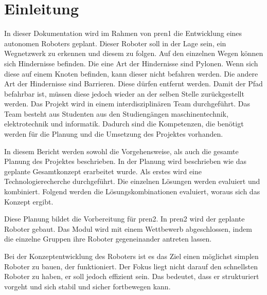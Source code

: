 \section{Einleitung}

In dieser Dokumentation wird im Rahmen von \acrfull{pren1} die Entwicklung eines autonomen Roboters geplant. Dieser Roboter soll in der Lage sein, ein Wegnetzwerk zu erkennen und diesem zu folgen. Auf den einzelnen Wegen können sich Hindernisse befinden. Die eine Art der Hindernisse sind Pylonen. Wenn sich diese auf einem Knoten befinden, kann dieser nicht befahren werden. Die andere Art der Hindernisse sind Barrieren. Diese dürfen entfernt werden. Damit der Pfad befahrbar ist, müssen diese jedoch wieder an der selben Stelle zurückgestellt werden.
Das Projekt wird in einem interdisziplinären Team durchgeführt. Das Team besteht aus Studenten aus den Studiengängen \acrfull{maschinentechnik}, \acrfull{elektrotechnik} und \acrfull{informatik}. Dadurch sind die Kompetenzen, die benötigt werden für die Planung und die Umsetzung des Projektes vorhanden.

In diesem Bericht werden sowohl die Vorgehensweise, als auch die gesamte Planung des Projektes beschrieben. In der Planung wird beschrieben wie das geplante Gesamtkonzept erarbeitet wurde. Als erstes wird eine Technologierecherche durchgeführt. Die einzelnen Lösungen werden evaluiert und kombiniert. Folgend werden die Lösungskombinationen evaluiert, woraus sich das Konzept ergibt.

Diese Planung bildet die Vorbereitung für \acrfull{pren2}. In \acrshort{pren2} wird der geplante Roboter gebaut. Das Modul wird mit einem Wettbewerb abgeschlossen, indem die einzelne Gruppen ihre Roboter gegeneinander antreten lassen.

Bei der Konzeptentwicklung des Roboters ist es das Ziel einen möglichst simplen Roboter zu bauen, der funktioniert. Der Fokus liegt nicht darauf den schnellsten Roboter zu haben, er soll jedoch effizient sein. Das bedeutet, dass er strukturiert vorgeht und sich stabil und sicher fortbewegen kann.
